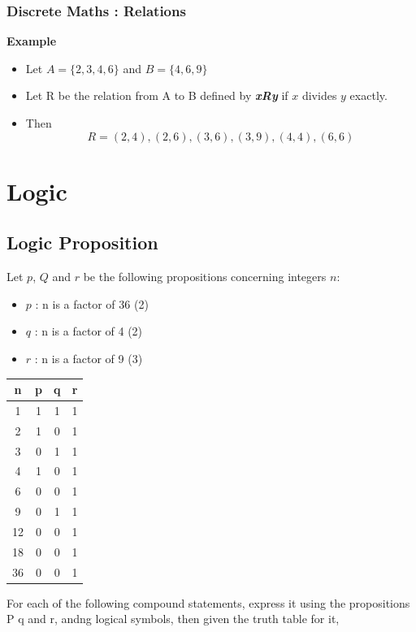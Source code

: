 \documentclass[]{report}
\begin{document}

\subsection{Discrete Maths : Relations}

\textbf{Example}
\begin{itemize}

\item Let $A = \{2, 3, 4, 6\}$ and $B = \{4, 6, 9\}$
\item Let R be the relation from A to B defined by \textit{\textbf{xRy}} if $x$
divides $y$ exactly.
\item  Then
\[R = {(2, 4), (2, 6), (3, 6), (3, 9), (4, 4), (6, 6)}\]
\end{itemize}



\chapter{Logic}


\section{Logic Proposition}
Let $p$, $Q$ and $r$ be the following propositions concerning integers $n$:

\begin{itemize}
\item $p$ : n is a factor of 36 (2)
\item $q$ : n is a factor of 4 (2)
\item $r$ : n is a factor of 9 (3)
\end{itemize}

{

\begin{center}
\begin{tabular}{|c||c|c|c|}
\hline 
\phantom{spa} \textbf{n} \phantom{spa}	& \phantom{spa}	\textbf{p} \phantom{spa}	& \phantom{spa}	\textbf{q} \phantom{spa}	& \phantom{spa}	\textbf{r} \phantom{spa}	\\ \hline \hline
1	&	1	&	1	&	1	\\ \hline
2	&	1	&	0	&	1	\\ \hline
3	&	0	&	1	&	1	\\ \hline
4	&	1	&	0	&	1	\\ \hline
6	&	0	&	0	&	1	\\ \hline
9	&	0	&	1	&	1	\\ \hline
12	&	0	&	0	&	1	\\ \hline
18	&	0	&	0	&	1	\\ \hline
36	&	0	&	0	&	1	\\
\hline 
\end{tabular} 
\end{center}
}
For each of the following compound statements, express it using the propositions P q and r, andng logical symbols, then given the truth table for it,
\end{document}
